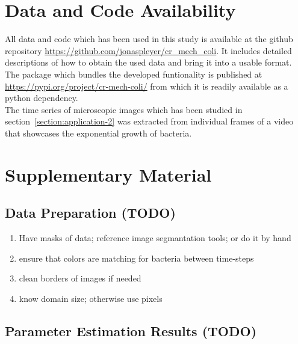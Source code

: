 \documentclass{article}
\begin{document}
\section{Data and Code Availability}
\label{section:data-code-availability}
All data and code which has been used in this study is available at the github repository
\url{https://github.com/jonaspleyer/cr\_mech\_coli}.
It includes detailed descriptions of how to obtain the used data and bring it into a usable format.
The package which bundles the developed funtionality is published at
\url{https://pypi.org/project/cr-mech-coli/} from which it is readily available as a python
dependency.\\
The time series of microscopic images which has been studied in section~\ref{section:application-2}
was extracted from individual frames of a video~\cite{https://doi.org/10.3203/iwf/k-129} that
showcases the exponential growth of bacteria.




\appendix
\renewcommand{\thesection}{}
\renewcommand{\thesubsection}{S\arabic{subsection}}
\section{Supplementary Material}

\subsection{Data Preparation (TODO)}
\begin{enumerate}
    \item Have masks of data; reference image segmantation tools; or do it by hand
    \item ensure that colors are matching for bacteria between time-steps
    \item clean borders of images if needed
    \item know domain size; otherwise use pixels
\end{enumerate}

\subsection{Parameter Estimation Results (TODO)}
\label{sec:supplement-parameter-profiles}
\end{document}
